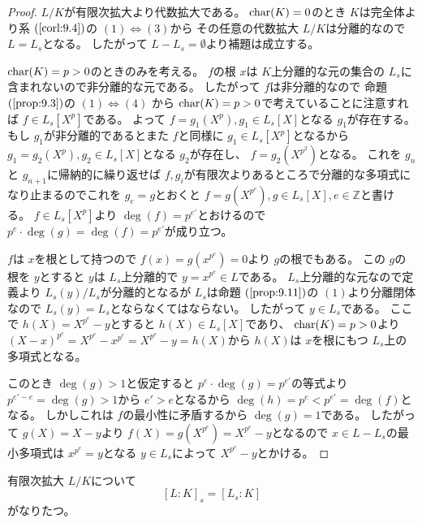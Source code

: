 \documentclass[../master_galois_theory]{subfiles}
\begin{document}
\begin{proof}
  $L/K$が有限次拡大より代数拡大である。
  $\mathrm{char}(K) = 0$のとき $K$は完全体より系 $(\mathrm{\ref{corl:9.4}})$の
  $(1) \Leftrightarrow (3)$から
  その任意の代数拡大 $L/K$は分離的なので $L = L_s$となる。
  したがって $L - L_s = \emptyset$より補題は成立する。

  $\mathrm{char}(K) = p > 0$のときのみを考える。
  $f$の根 $x$は $K$上分離的な元の集合の $L_s$に含まれないので非分離的な元である。
  したがって $f$は非分離的なので
  命題 $(\mathrm{\ref{prop:9.3}})$の $(1) \Leftrightarrow (4)$
  から $\mathrm{char}(K) = p > 0$で考えていることに注意すれば
  $f \in L_s[X^p]$である。
  よって $f = g_1(X^p) , g_1 \in L_s[X]$となる
  $g_1$が存在する。
  もし $g_1$が非分離的であるとまた $f$と同様に
  $g_1 \in L_s[X^p]$となるから $g_1 = g_2(X^p) , g_2 \in L_s[X]$となる
  $g_2$が存在し、 $f  = g_2(X^{p^2})$となる。
  これを $g_n$と $g_{n+1}$に帰納的に繰り返せば $f , g_i$が有限次よりあるところで分離的な多項式になり止まるのでこれを $g_e = g$とおくと
  $f = g(X^{p^e}) , g \in L_s[X] , e \in \mathbb{Z}$と書ける。
  $f \in L_s[X^p]$より $\deg(f) = p^{e'}$とおけるので
  $p^e \cdot \deg(g) = \deg(f) = p^{e'}$が成り立つ。

  $f$は $x$を根として持つので $f(x) = g(x^{p^e}) = 0$より $g$の根でもある。
  この $g$の根を $y$とすると $y$は $L_s$上分離的で $y = x^{p^e} \in L$である。
  $L_s$上分離的な元なので定義より $L_s(y)/L_s$が分離的となるが
  $L_s$は命題 $(\mathrm{\ref{prop:9.11}})$の $(1)$より分離閉体なので
  $L_s(y) = L_s$とならなくてはならない。
  したがって $y \in L_s$である。
  ここで $h(X) = X^{p^e} - y$とすると $h(X) \in L_s[X]$であり、
  $\mathrm{char}(K) = p > 0$より $(X - x)^{p^e} = X^{p^e} - x^{p^e} = X^{p^e} - y = h(X)$から
  $h(X)$は $x$を根にもつ $L_s$上の多項式となる。

  このとき $\deg(g) > 1$と仮定すると
  $p^e \cdot \deg(g) = p^{e'}$の等式より
  $p^{e'-e} = \deg(g) > 1$から $e' > e$となるから
  $\deg(h) = p^e < p^{e'} = \deg(f)$となる。
  しかしこれは $f$の最小性に矛盾するから $\deg(g) = 1$である。
  したがって $g(X) = X - y$より $f(X) = g(X^{p^e}) = X^{p^e} - y$となるので $x \in L - L_s$の最小多項式は $x^{p^e} = y$となる
  $y \in L_s$によって $X^{p^e} - y$とかける。

\end{proof}

\begin{prop} \label{prop:9.13}
  有限次拡大 $L/K$について
  \[
  [L:K]_s = [L_s:K]
  \]
  がなりたつ。
\end{prop}
\end{document}
